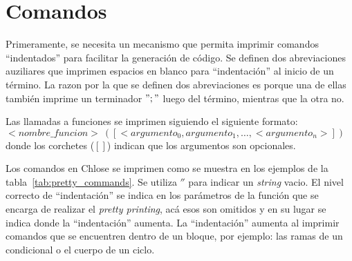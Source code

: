 \section{Comandos}

Primeramente, se necesita un mecanismo que permita imprimir comandos ``indentados'' para facilitar la generación de código.
Se definen dos abreviaciones auziliares que imprimen espacios en blanco para ``indentación'' al inicio de un término.
La razon por la que se definen dos abreviaciones es porque una de ellas también imprime un terminador $";"$ luego del término, mientras que la otra no.

Las llamadas a funciones se imprimen siguiendo el siguiente formato: $<nombre\_funcion>\ ([<argumento_0, argumento_1, \dots, <argumento_n>])$ donde los corchetes ($[]$) indican que los argumentos son opcionales.

Los comandos en Chlose se imprimen como se muestra en los ejemplos de la tabla~\ref{tab:pretty_commands}.
Se utiliza $''$ para indicar un \textit{string} vacio.
El nivel correcto de ``indentación'' se indica en los parámetros de la función que se encarga de realizar el \textit{pretty printing}, acá esos son omitidos y en su lugar se indica donde la ``indentación'' aumenta.
La ``indentación'' aumenta al imprimir comandos que se encuentren dentro de un bloque, por ejemplo: las ramas de un condicional o el cuerpo de un ciclo.

